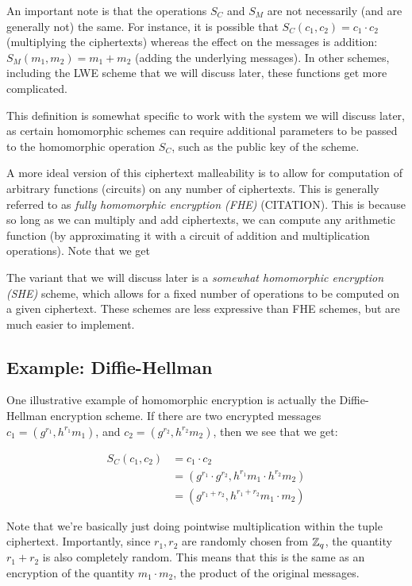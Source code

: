 \documentclass{theme}
\begin{document}
An important note is that the operations $S_C$ and $S_M$ are not necessarily (and are generally not) the same. For instance, it is possible that $S_C(c_1, c_2) = c_1 \cdot c_2$ (multiplying the ciphertexts) whereas the effect on the messages is addition: $S_M(m_1, m_2) = m_1 + m_2$ (adding the underlying messages). In other schemes, including the LWE scheme that we will discuss later, these functions get more complicated.

This definition is somewhat specific to work with the system we will discuss later, as certain homomorphic schemes can require additional parameters to be passed to the homomorphic operation $S_C$, such as the public key of the scheme.

A more ideal version of this ciphertext malleability is to allow for computation of arbitrary functions (circuits) on any number of ciphertexts. This is generally referred to as \textit{fully homomorphic encryption (FHE)} (CITATION). This is because so long as we can multiply and add ciphertexts, we can compute any arithmetic function (by approximating it with a circuit of addition and multiplication operations). Note that we get

The variant that we will discuss later is a \textit{somewhat homomorphic encryption (SHE)} scheme, which allows for a fixed number of operations to be computed on a given ciphertext. These schemes are less expressive than FHE schemes, but are much easier to implement.

\subsection{Example: Diffie-Hellman}

One illustrative example of homomorphic encryption is actually the Diffie-Hellman encryption scheme. If there are two encrypted messages $c_1 = (g^{r_1}, h^{r_1} m_1)$, and $c_2 = (g^{r_2}, h^{r_2} m_2)$, then we see that we get:

\begin{align}
    S_C(c_1, c_2) & = c_1 \cdot c_2                                          \\
                  & = (g^{r_1} \cdot g^{r_2}, h^{r_1} m_1 \cdot h^{r_2} m_2) \\
                  & = (g^{r_1 + r_2}, h^{r_1 + r_2} m_1 \cdot m_2)
\end{align}

Note that we're basically just doing pointwise multiplication within the tuple ciphertext. Importantly, since $r_1, r_2$ are randomly chosen from $\mathbb{Z}_q$, the quantity $r_1 + r_2$ is also completely random. This means that this is the same as an encryption of the quantity $m_1 \cdot m_2$, the product of the original messages.
\end{document}

